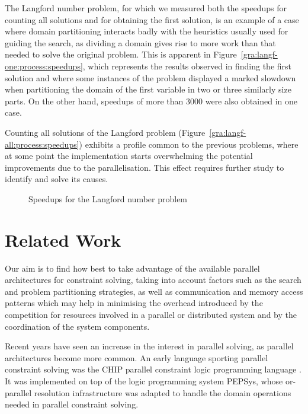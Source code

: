 \documentclass{llncs}
\begin{document}
The Langford number problem, for which we measured both the speedups
for counting all solutions and for obtaining the first solution, is an
example of a case where domain partitioning interacts badly with the
heuristics usually used for guiding the search, as dividing a domain
gives rise to more work than that needed to solve the original
problem. This is apparent in
Figure~\ref{gra:langf-one:process:speedups}, which represents the
results observed in finding the first solution and where some
instances of the problem displayed a marked slowdown when partitioning
the domain of the first variable in two or three similarly size parts.
On the other hand, speedups of more than 3000 were also obtained in
one case.


Counting all solutions of the Langford problem
(Figure~\ref{gra:langf-all:process:speedups}) exhibits a profile
common to the previous problems, where at some point the
implementation starts overwhelming the potential improvements due to
the parallelisation. This effect requires further study to identify
and solve its causes.

\begin{figure}[ht]
  \centering
  \caption{Speedups for the Langford number problem}
\end{figure}


\section{Related Work}
\label{sec:related}

Our aim is to find how best to take advantage of the available
parallel architectures for constraint solving, taking into account
factors such as the search and problem partitioning strategies, as
well as communication and memory access patterns which may help in
minimising the overhead introduced by the competition for resources
involved in a parallel or distributed system and by the coordination
of the system components.

Recent years have seen an increase in the interest in parallel
solving, as parallel architectures become more common. An early
language sporting parallel constraint solving was the CHIP parallel
constraint logic programming language \cite{chip89}. It was
implemented on top of the logic programming system PEPSys, whose
or-parallel resolution infrastructure was adapted to handle the domain
operations needed in parallel constraint solving.
\end{document}
